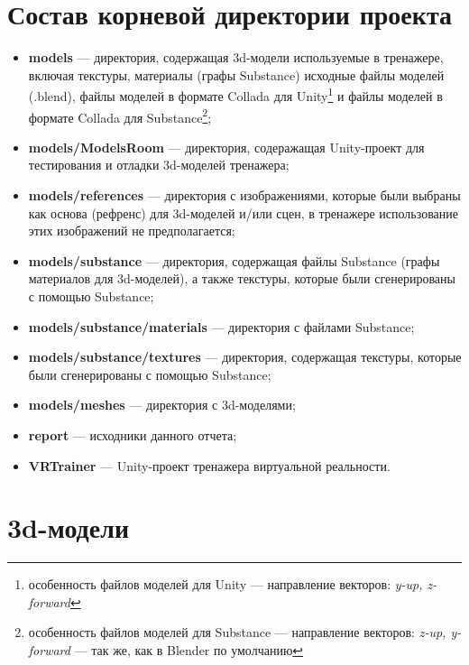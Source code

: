 

\usepackage{dirtree}




\section{Состав корневой директории проекта}


\begin{itemize}
	\item \textbf{models} --- директория, содержащая 3d-модели используемые в тренажере, включая текстуры, материалы (графы Substance) исходные файлы моделей (.blend), файлы моделей в формате Collada для Unity\footnote{особенность файлов моделей для Unity --- направление векторов: \textit{y-up, z-forward}} и файлы моделей в формате Collada для Substance\footnote{особенность файлов моделей для Substance --- направление векторов: \textit{z-up, y-forward} --- так же, как в Blender по умолчанию};
	\item \textbf{models/ModelsRoom} --- директория, содеражащая Unity-проект для тестирования и отладки 3d-моделей тренажера;
	\item \textbf{models/references} --- директория с изображениями, которые были выбраны как основа (рефренс) для 3d-моделей и/или сцен, в тренажере использование этих изображений не предполагается; 
	\item \textbf{models/substance} --- директория, содержащая файлы Substance (графы материалов для 3d-моделей), а также текстуры, которые были сгенерированы с помощью Substance;
	\item \textbf{models/substance/materials} --- директория с файлами Substance;
	\item \textbf{models/substance/textures} --- директория, содержащая текстуры, которые были сгенерированы с помощью Substance;
	\item \textbf{models/meshes} --- директория с 3d-моделями;
	\item \textbf{report} --- исходники данного отчета;
	\item \textbf{VRTrainer} --- Unity-проект тренажера виртуальной реальности.
\end{itemize}


\section{3d-модели}

